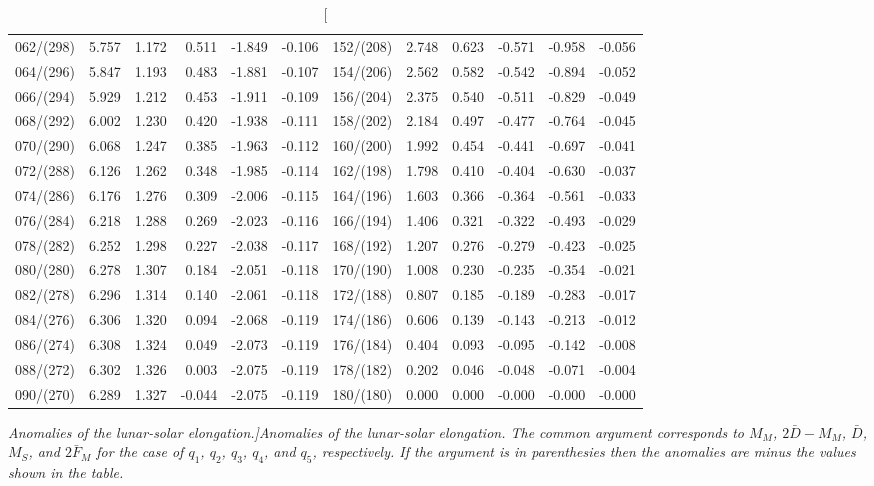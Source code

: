 \begin{table}
{\begin{tabular}{crrrrr|crrrrr}
062/(298) &  5.757 &  1.172 &  0.511 & -1.849 & -0.106 & 152/(208) &  2.748 &  0.623 & -0.571 & -0.958 & -0.056\\
064/(296) &  5.847 &  1.193 &  0.483 & -1.881 & -0.107 & 154/(206) &  2.562 &  0.582 & -0.542 & -0.894 & -0.052\\
066/(294) &  5.929 &  1.212 &  0.453 & -1.911 & -0.109 & 156/(204) &  2.375 &  0.540 & -0.511 & -0.829 & -0.049\\
068/(292) &  6.002 &  1.230 &  0.420 & -1.938 & -0.111 & 158/(202) &  2.184 &  0.497 & -0.477 & -0.764 & -0.045\\
070/(290) &  6.068 &  1.247 &  0.385 & -1.963 & -0.112 & 160/(200) &  1.992 &  0.454 & -0.441 & -0.697 & -0.041\\
072/(288) &  6.126 &  1.262 &  0.348 & -1.985 & -0.114 & 162/(198) &  1.798 &  0.410 & -0.404 & -0.630 & -0.037\\
074/(286) &  6.176 &  1.276 &  0.309 & -2.006 & -0.115 & 164/(196) &  1.603 &  0.366 & -0.364 & -0.561 & -0.033\\
076/(284) &  6.218 &  1.288 &  0.269 & -2.023 & -0.116 & 166/(194) &  1.406 &  0.321 & -0.322 & -0.493 & -0.029\\
078/(282) &  6.252 &  1.298 &  0.227 & -2.038 & -0.117 & 168/(192) &  1.207 &  0.276 & -0.279 & -0.423 & -0.025\\
080/(280) &  6.278 &  1.307 &  0.184 & -2.051 & -0.118 & 170/(190) &  1.008 &  0.230 & -0.235 & -0.354 & -0.021\\
082/(278) &  6.296 &  1.314 &  0.140 & -2.061 & -0.118 & 172/(188) &  0.807 &  0.185 & -0.189 & -0.283 & -0.017\\
084/(276) &  6.306 &  1.320 &  0.094 & -2.068 & -0.119 & 174/(186) &  0.606 &  0.139 & -0.143 & -0.213 & -0.012\\
086/(274) &  6.308 &  1.324 &  0.049 & -2.073 & -0.119 & 176/(184) &  0.404 &  0.093 & -0.095 & -0.142 & -0.008\\
088/(272) &  6.302 &  1.326 &  0.003 & -2.075 & -0.119 & 178/(182) &  0.202 &  0.046 & -0.048 & -0.071 & -0.004\\
090/(270) &  6.289 &  1.327 & -0.044 & -2.075 & -0.119 & 180/(180) &  0.000 &  0.000 & -0.000 & -0.000 & -0.000\\
\end{tabular}}
\caption[\em Anomalies of the lunar-solar elongation.]{\em Anomalies of the lunar-solar elongation. The common argument corresponds to
$M_M$, $2\bar{D}-M_M$, $\bar{D}$, $M_S$, and $2\bar{F}_M$ for the case of
$q_1$, $q_2$, $q_3$, $q_4$, and $q_5$, respectively. If the argument is
in parenthesies then the anomalies are minus the values shown
in the table. }\label{telona}
\end{table}

